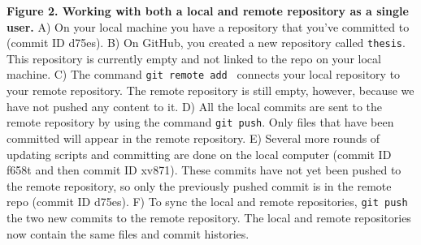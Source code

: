 \textbf{Figure 2. Working with both a local and remote repository as a single user.} A) On your local machine you have a repository that you've committed to (commit ID d75es). B) On GitHub, you created a new repository called \verb|thesis|. This repository is currently empty and not linked to the repo on your local machine. C) The command \verb|git remote add | connects your local repository to your remote repository. The remote repository is still empty, however, because we have not pushed any content to it. D) All the local commits are sent to the remote repository by using the command \verb|git push|. Only files that have been committed will appear in the remote repository. E) Several more rounds of updating scripts and committing are done on the local computer (commit ID f658t and then commit ID xv871). These commits have not yet been pushed to the remote repository, so only the previously pushed commit is in the remote repo (commit ID d75es). F) To sync the local and remote repositories, \verb|git push| the two new commits to the remote repository. The local and remote repositories now contain the same files and commit histories. 